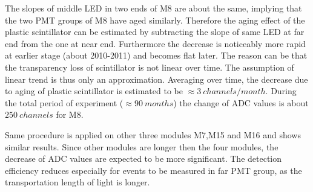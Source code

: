 The slopes of middle LED in two ends of M8 are about the same, implying that the two PMT groups of M8 have aged similarly. Therefore the aging effect of the plastic scintillator can be estimated by subtracting the slope of same LED at far end from the one at near end.
Furthermore the decrease is noticeably more rapid at earlier stage (about 2010-2011) and becomes flat later. The reason can be that the transparency loss of scintillator is not linear over time. The assumption of linear trend is thus only an approximation.
Averaging over time, the decrease due to aging of plastic scintillator is estimated to be $\approx \SI{3}{channels\per month}$.
During the total period of experiment ($\approx\SI{90}{months}$) the change of ADC values is about $\SI{250}{channels}$ for M8.

Same procedure is applied on other three modules M7,M15 and M16 and shows similar results. Since other modules are longer then the four modules, the decrease of ADC values are expected to be more significant. The detection efficiency reduces especially for events to be measured in far PMT group, as the transportation length of light is longer.

